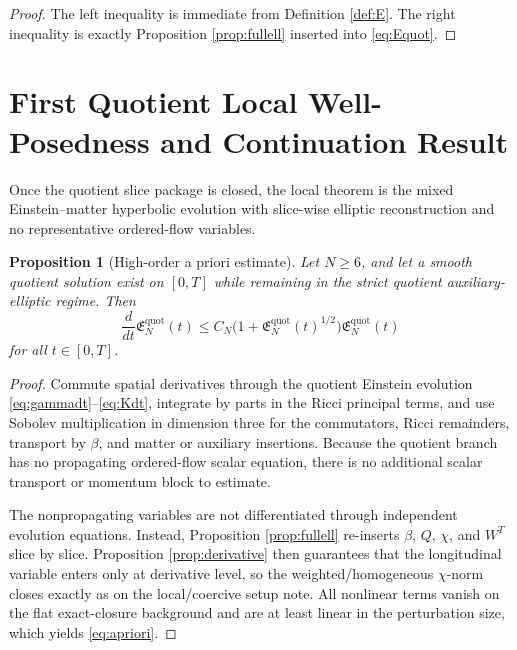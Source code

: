 \documentclass[11pt]{article}
\newtheorem{proposition}{Proposition}
\begin{document}
\begin{proof}
The left inequality is immediate from Definition \ref{def:E}. The right inequality is exactly Proposition \ref{prop:fullell} inserted into \eqref{eq:Equot}.
\end{proof}

\section{First Quotient Local Well-Posedness and Continuation Result}

Once the quotient slice package is closed, the local theorem is the mixed Einstein--matter hyperbolic evolution with slice-wise elliptic reconstruction and no representative ordered-flow variables.

\begin{proposition}[High-order a priori estimate]
\label{prop:apriori}
Let \(N\ge 6\), and let a smooth quotient solution exist on \([0,T]\) while remaining in the strict quotient auxiliary-elliptic regime. Then
\begin{equation}
\frac{d}{dt}\mathfrak E_N^{\mathrm{quot}}(t)
\le
C_N\bigl(1+\mathfrak E_N^{\mathrm{quot}}(t)^{1/2}\bigr)\mathfrak E_N^{\mathrm{quot}}(t)
\label{eq:apriori}
\end{equation}
for all \(t\in[0,T]\).
\end{proposition}

\begin{proof}
Commute spatial derivatives through the quotient Einstein evolution \eqref{eq:gammadt}--\eqref{eq:Kdt}, integrate by parts in the Ricci principal terms, and use Sobolev multiplication in dimension three for the commutators, Ricci remainders, transport by \(\beta\), and matter or auxiliary insertions. Because the quotient branch has no propagating ordered-flow scalar equation, there is no additional scalar transport or momentum block to estimate.

The nonpropagating variables are not differentiated through independent evolution equations. Instead, Proposition \ref{prop:fullell} re-inserts \(\beta\), \(Q\), \(\chi\), and \(W^T\) slice by slice. Proposition \ref{prop:derivative} then guarantees that the longitudinal variable enters only at derivative level, so the weighted/homogeneous \(\chi\)-norm closes exactly as on the local/coercive setup note. All nonlinear terms vanish on the flat exact-closure background and are at least linear in the perturbation size, which yields \eqref{eq:apriori}.
\end{proof}
\end{document}
